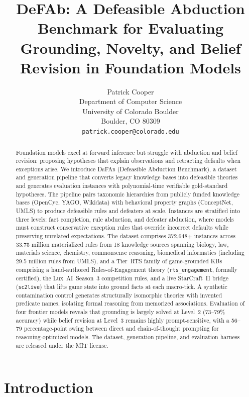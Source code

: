 \documentclass{article}
\title{DeFAb: A Defeasible Abduction Benchmark for Evaluating\\Grounding, Novelty, and Belief Revision in Foundation Models}
\author{%
  Patrick Cooper \\
  Department of Computer Science\\
  University of Colorado Boulder\\
  Boulder, CO 80309 \\
  \texttt{patrick.cooper@colorado.edu} \\
}
\theoremstyle{definition}
\begin{document}
\maketitle


\begin{abstract}
Foundation models excel at forward inference but struggle with abduction and belief revision: proposing hypotheses that explain observations and retracting defaults when exceptions arise. We introduce \textsc{DeFAb} (Defeasible Abduction Benchmark), a dataset and generation pipeline that converts legacy knowledge bases into defeasible theories and generates evaluation instances with polynomial-time verifiable gold-standard hypotheses. The pipeline pairs taxonomic hierarchies from publicly funded knowledge bases (OpenCyc, YAGO, Wikidata) with behavioral property graphs (ConceptNet, UMLS) to produce defeasible rules and defeaters at scale. Instances are stratified into three levels: fact completion, rule abduction, and defeater abduction, where models must construct conservative exception rules that override incorrect defaults while preserving unrelated expectations. The dataset comprises 372,648+ instances across 33.75 million materialized rules from 18 knowledge sources spanning biology, law, materials science, chemistry, commonsense reasoning, biomedical informatics (including 29.5 million rules from UMLS), and a Tier~RTS family of game-grounded KBs comprising a hand-authored Rules-of-Engagement theory (\texttt{rts\_engagement}, formally certified), the Lux~AI~Season~3 competition rules, and a live StarCraft~II bridge (\texttt{sc2live}) that lifts game state into ground facts at each macro-tick. A synthetic contamination control generates structurally isomorphic theories with invented predicate names, isolating formal reasoning from memorized associations. Evaluation of four frontier models reveals that grounding is largely solved at Level~2 (73--79\% accuracy) while belief revision at Level~3 remains highly prompt-sensitive, with a 56--79 percentage-point swing between direct and chain-of-thought prompting for reasoning-optimized models. The dataset, generation pipeline, and evaluation harness are released under the MIT license.
\end{abstract}


\section{Introduction}\label{sec:intro}
\end{document}
